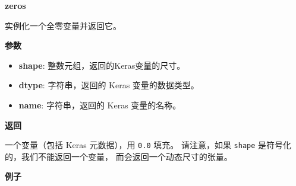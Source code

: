 \begin{Shaded}
\begin{Highlighting}[]
\OperatorTok{>>>}    
\OperatorTok{>>>} \OperatorTok{=} \NormalTok{K.variable(np.array([[}\NormalTok{, }\NormalTok{], [}\NormalTok{, }\NormalTok{]]), dtype}\OperatorTok{=}\NormalTok{)}
\OperatorTok{>>>} 
\NormalTok{array([[ }\NormalTok{.],}
       \NormalTok{[ }\NormalTok{.]], dtype}\OperatorTok{=}
\end{Highlighting}
\end{Shaded}


\textbf{zeros}\label{zeros}

\begin{Shaded}
\begin{Highlighting}[]
\OperatorTok{=}\OperatorTok{=}\NormalTok{)}
\end{Highlighting}
\end{Shaded}

实例化一个全零变量并返回它。

\textbf{参数}

\begin{itemize}
\tightlist
\item
  \textbf{shape}: 整数元组，返回的Keras变量的尺寸。
\item
  \textbf{dtype}: 字符串，返回的 Keras 变量的数据类型。
\item
  \textbf{name}: 字符串，返回的 Keras 变量的名称。
\end{itemize}

\textbf{返回}

一个变量（包括 Keras 元数据），用 \texttt{0.0} 填充。 请注意，如果
\texttt{shape} 是符号化的，我们不能返回一个变量，
而会返回一个动态尺寸的张量。

\textbf{例子}

\begin{Shaded}
\begin{Highlighting}[]
\OperatorTok{>>>}    
\OperatorTok{>>>} \OperatorTok{=} \NormalTok{,}\NormalTok{))}
\OperatorTok{>>>} 
\NormalTok{array([[ }\NormalTok{.],}
       \NormalTok{[ }\NormalTok{.],}
       \NormalTok{[ }\NormalTok{.]], dtype}\OperatorTok{=}
\end{Highlighting}
\end{Shaded}



